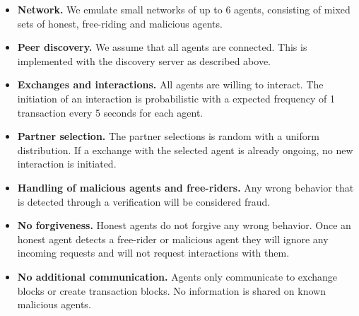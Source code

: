 \begin{itemize}
  \item \textbf{Network.} We emulate small networks of up to 6 agents, consisting of mixed sets of honest, free-riding and 
  malicious agents.
  \item \textbf{Peer discovery.} We assume that all agents are connected. This is implemented with the discovery server as described 
  above. 
  \item \textbf{Exchanges and interactions.} All agents are willing to interact. The initiation of an
  interaction is probabilistic with a expected frequency of 1 transaction every 5 seconds for each agent. 
  \item \textbf{Partner selection.} The partner selections is random with a uniform distribution. If 
  a exchange with the selected agent is already ongoing, no new interaction is initiated.
  \item \textbf{Handling of malicious agents and free-riders.} Any wrong behavior that is detected
  through a verification will be considered fraud. 
  \item \textbf{No forgiveness.} Honest agents do not forgive any wrong behavior.
  Once an honest agent detects a free-rider or malicious agent they will ignore any incoming requests
  and will not request interactions with them. 
  \item \textbf{No additional communication.} Agents only communicate to exchange blocks or create 
  transaction blocks. No information is shared on known malicious agents.
\end{itemize}





